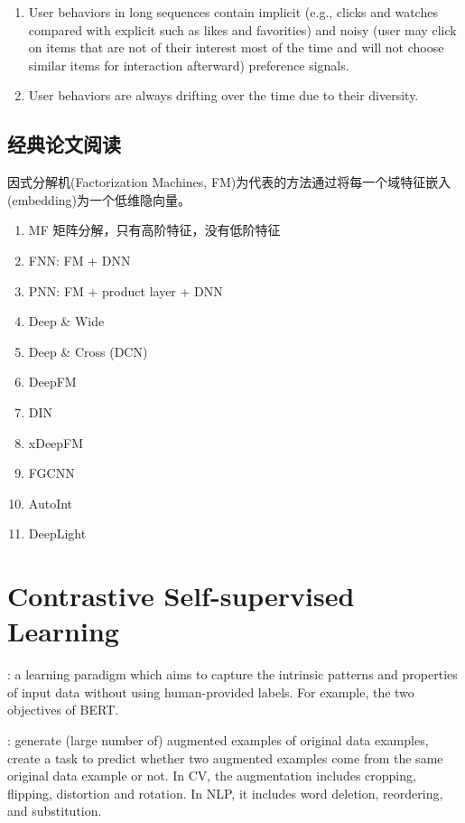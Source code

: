 \begin{enumerate}
	\item User behaviors in long sequences contain implicit (e.g., clicks and watches compared with explicit such as likes and favorities) and noisy (user may click on items that are not of their interest most of the time and will not choose similar items for interaction afterward) preference signals.
	\item User behaviors are always drifting over the time due to their diversity.
\end{enumerate}

\subsection{经典论文阅读}

因式分解机(Factorization Machines, FM)为代表的方法通过将每一个域特征嵌入(embedding)为一个低维隐向量。

\begin{enumerate}
	\item MF 矩阵分解，只有高阶特征，没有低阶特征
	\item FNN: FM + DNN
	\item PNN: FM + product layer + DNN
	\item Deep \& Wide
	\item Deep \& Cross (DCN)
	\item DeepFM
	\item DIN
	\item xDeepFM
	\item FGCNN
	\item AutoInt
	\item DeepLight
\end{enumerate}


\section{Contrastive Self-supervised Learning}

: a learning paradigm which aims to capture the intrinsic patterns and properties of input
data without using human-provided labels. For example, the two objectives of BERT.

: generate (large number of) augmented examples of original data examples, create a task to predict whether two augmented examples come from the same original data example or not.
In CV, the augmentation includes cropping, flipping, distortion and rotation.
In NLP, it includes word deletion, reordering, and substitution.

